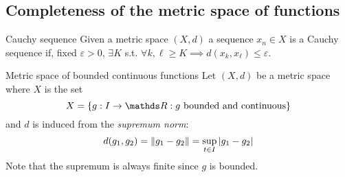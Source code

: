 \documentclass[12pt]{extarticle}
\numberwithin{equation}{section}
\begin{document}
\subsection{Completeness of the metric space of functions}

\begin{definition}{Cauchy sequence}{}
  Given a metric space $(X, d)$ a sequence $x_n \in X$ is a Cauchy sequence if,
  fixed $\varepsilon > 0$,
  $\exists K$ s.t. $\forall k, \ell \geq K
  \implies d(x_k, x_\ell) \leq \varepsilon$.
\end{definition}

\begin{definition}{Metric space of bounded continuous functions}{}
    Let $(X, d)$ be a metric space where $X$ is the set
    \begin{equation}
        X = \{ g:I \to \R : g \text{ bounded and continuous} \}
    \end{equation}
    and $d$ is induced from the \emph{supremum norm}:
    \begin{equation}
        d(g_1, g_2) = \norm{g_1 - g_2} = \sup_{t \in I} \abs{g_1 - g_2}
    \end{equation}
    Note that the supremum is always finite since $g$ is bounded.
\end{definition}
\end{document}
